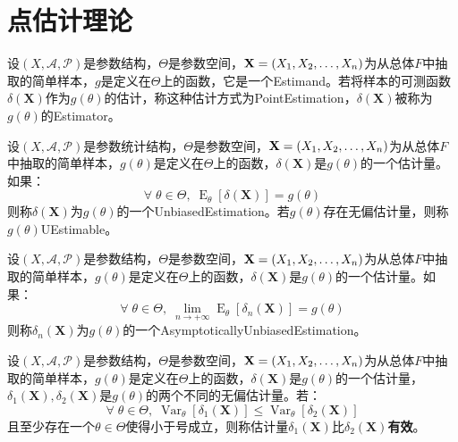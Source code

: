 \chapter{点估计理论}

\begin{definition}
	设$(X,\mathscr{A},\mathscr{P})$是参数结构，$\Theta$是参数空间，$\mathbf{X}=(X_1, X_2, \dots, X_{n})$为从总体$F$中抽取的简单样本，$g$是定义在$\Theta$上的函数，它是一个\gls{Estimand}。若将样本的可测函数$\delta(\mathbf{X})$作为$g(\theta)$的估计，称这种估计方式为\gls{PointEstimation}，$\delta(\mathbf{X})$被称为$g(\theta)$的\gls{Estimator}。
\end{definition}
\begin{definition}
	设$(X,\mathscr{A},\mathscr{P})$是参数统计结构，$\Theta$是参数空间，$\mathbf{X}=(X_1, X_2, \dots, X_{n})$为从总体$F$中抽取的简单样本，$g(\theta)$是定义在$\Theta$上的函数，$\delta(\mathbf{X})$是$g(\theta)$的一个估计量。如果：
	\begin{equation*}
		\forall\;\theta\in\Theta,\;\operatorname{E}_{\theta}[\delta(\mathbf{X})]=g(\theta)
	\end{equation*}
	则称$\delta(\mathbf{X})$为$g(\theta)$的一个\gls{UnbiasedEstimation}。若$g(\theta)$存在无偏估计量，则称$g(\theta)$\gls{UEstimable}。
\end{definition}
\begin{definition}
	设$(X,\mathscr{A},\mathscr{P})$是参数结构，$\Theta$是参数空间，$\mathbf{X}=(X_1, X_2, \dots, X_{n})$为从总体$F$中抽取的简单样本，$g(\theta)$是定义在$\Theta$上的函数，$\delta(\mathbf{X})$是$g(\theta)$的一个估计量。如果：
	\begin{equation*}
		\forall\;\theta\in\Theta,\;\lim_{n\to+\infty}\operatorname{E}_{\theta}[\delta_n(\mathbf{X})]=g(\theta)
	\end{equation*}
	则称$\delta_n(\mathbf{X})$为$g(\theta)$的一个\gls{AsymptoticallyUnbiasedEstimation}。
\end{definition}
\begin{definition}
	设$(X,\mathscr{A},\mathscr{P})$是参数结构，$\Theta$是参数空间，$\mathbf{X}=(X_1, X_2, \dots, X_{n})$为从总体$F$中抽取的简单样本，$g(\theta)$是定义在$\Theta$上的函数，$\delta(\mathbf{X})$是$g(\theta)$的一个估计量，$\delta_1(\mathbf{X}),\delta_2(\mathbf{X})$是$g(\theta)$的两个不同的无偏估计量。若：
	\begin{equation*}
		\forall\;\theta\in\Theta,\;\operatorname{Var}_{\theta}[\delta_1(\mathbf{X})]\leqslant\operatorname{Var}_{\theta}[\delta_2(\mathbf{X})]
	\end{equation*}
	且至少存在一个$\theta\in\Theta$使得小于号成立，则称估计量$\delta_1(\mathbf{X})$比$\delta_2(\mathbf{X})$\textbf{有效}。
\end{definition}
